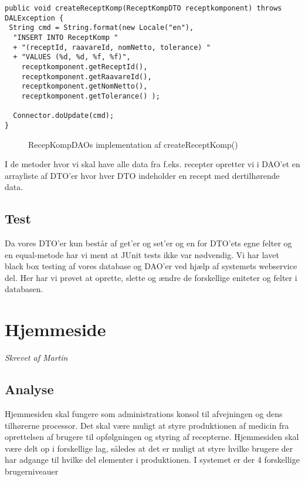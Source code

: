 \documentclass[a4paper]{article}
\begin{document}
\begin{lstlisting}
public void createReceptKomp(ReceptKompDTO receptkomponent) throws DALException {
 String cmd = String.format(new Locale("en"),
  "INSERT INTO ReceptKomp " 
  + "(receptId, raavareId, nomNetto, tolerance) "
  + "VALUES (%d, %d, %f, %f)",
    receptkomponent.getReceptId(),
    receptkomponent.getRaavareId(),
    receptkomponent.getNomNetto(),
    receptkomponent.getTolerance() );

  Connector.doUpdate(cmd);
}
\end{lstlisting}
\begin{figure}[h!]
  \caption{RecepKompDAOs implementation af createReceptKomp()}
\end{figure}


I de metoder hvor vi skal have alle data fra f.eks. recepter opretter vi i DAO’et en arrayliste af DTO’er hvor hver DTO indeholder en recept med dertilhørende data.



\subsection{Test} %

Da vores DTO’er kun består af get’er og set’er og en for DTO’ets egne felter og en equal-metode har vi ment at JUnit tests ikke var nødvendig. Vi har lavet black box testing af vores database og DAO’er ved hjælp af systemets webservice del. Her har vi prøvet at oprette, slette og ændre de forskellige eniteter og felter i databasen. 


\clearpage



\section{Hjemmeside} %
\emph{Skrevet af Martin}

\subsection{Analyse} %

Hjemmesiden skal fungere som administrations konsol til afvejningen og dens tilhørerne processor.  Det skal være muligt at styre produktionen af medicin fra oprettelsen af brugere til opfølgningen og styring af recepterne.  Hjemmesiden skal være delt op i forskellige lag, således at det er muligt at styre hvilke brugere der har adgange til hvilke del elementer i produktionen. I systemet er der 4 forskellige brugerniveauer
\end{document}
